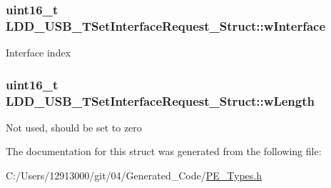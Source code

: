 \subsubsection[{w\+Interface}]{\setlength{\rightskip}{0pt plus 5cm}uint16\+\_\+t L\+D\+D\+\_\+\+U\+S\+B\+\_\+\+T\+Set\+Interface\+Request\+\_\+\+Struct\+::w\+Interface}\label{struct_l_d_d___u_s_b___t_set_interface_request___struct_a6554d6522c7dcbd0e96cbe945b1725de}
Interface index \hypertarget{struct_l_d_d___u_s_b___t_set_interface_request___struct_a7ccdd1f214e5cebbc10cde359ccba50e}{}
\subsubsection[{w\+Length}]{\setlength{\rightskip}{0pt plus 5cm}uint16\+\_\+t L\+D\+D\+\_\+\+U\+S\+B\+\_\+\+T\+Set\+Interface\+Request\+\_\+\+Struct\+::w\+Length}\label{struct_l_d_d___u_s_b___t_set_interface_request___struct_a7ccdd1f214e5cebbc10cde359ccba50e}
Not used, should be set to zero 

The documentation for this struct was generated from the following file\+:\begin{DoxyCompactItemize}
\item 
C\+:/\+Users/12913000/git/04/\+Generated\+\_\+\+Code/\hyperlink{_p_e___types_8h}{P\+E\+\_\+\+Types.\+h}\end{DoxyCompactItemize}
